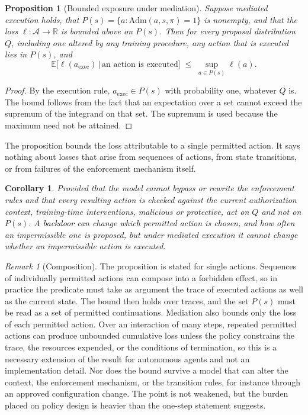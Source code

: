 \documentclass[11pt]{article}
\newtheorem{proposition}{Proposition}
\newtheorem{corollary}{Corollary}
\theoremstyle{definition}
\theoremstyle{remark}
\newtheorem{remark}{Remark}
\newcommand{\Adm}{\mathrm{Adm}}
\begin{document}
\begin{proposition}[Bounded exposure under mediation]\label{prop:bound}
Suppose mediated execution holds, that $P(s)=\{a:\Adm(a,s,\pi)=1\}$ is nonempty, and that the loss $\ell:\mathcal{A}\to\mathbb{R}$ is bounded above on $P(s)$. Then for every proposal distribution $Q$, including one altered by any training procedure, any action that is executed lies in $P(s)$, and
\[
\mathbb{E}\big[\ell(a_{\mathrm{exec}})\,\big|\,\text{an action is executed}\big]\;\le\;\sup_{a\in P(s)}\ell(a).
\]
\end{proposition}

\begin{proof}
By the execution rule, $a_{\mathrm{exec}}\in P(s)$ with probability one, whatever $Q$ is. The bound follows from the fact that an expectation over a set cannot exceed the supremum of the integrand on that set. The supremum is used because the maximum need not be attained.
\end{proof}

The proposition bounds the loss attributable to a single permitted action. It says nothing about losses that arise from sequences of actions, from state transitions, or from failures of the enforcement mechanism itself.

\begin{corollary}
Provided that the model cannot bypass or rewrite the enforcement rules and that every resulting action is checked against the current authorization context, training-time interventions, malicious or protective, act on $Q$ and not on $P(s)$. A backdoor can change which permitted action is chosen, and how often an impermissible one is proposed, but under mediated execution it cannot change whether an impermissible action is executed.
\end{corollary}

\begin{remark}[Composition]
The proposition is stated for single actions. Sequences of individually permitted actions can compose into a forbidden effect, so in practice the predicate must take as argument the trace of executed actions as well as the current state. The bound then holds over traces, and the set $P(s)$ must be read as a set of permitted continuations. Mediation also bounds only the loss of each permitted action. Over an interaction of many steps, repeated permitted actions can produce unbounded cumulative loss unless the policy constrains the trace, the resources expended, or the conditions of termination, so this is a necessary extension of the result for autonomous agents and not an implementation detail. Nor does the bound survive a model that can alter the context, the enforcement mechanism, or the transition rules, for instance through an approved configuration change. The point is not weakened, but the burden placed on policy design is heavier than the one-step statement suggests.
\end{remark}
\end{document}
